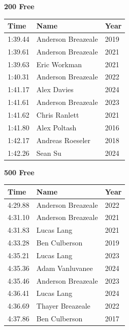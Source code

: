 \vspace{0.3em}
\vspace{1.2em}
\noindent\begin{minipage}[t]{0.48\textwidth}
\centering
\textbf{\textcolor{teamprimary}{200 Free}}\par
\vspace{0.5em}
\centering
\small
\renewcommand{\arraystretch}{1.0}
\setlength{\tabcolsep}{4pt}
\begin{tabular}{@{}p{1.8cm}p{3.0cm}p{1.0cm}@{}}
\toprule
\textbf{Time} & \textbf{Name} & \textbf{Year} \\
\midrule
1:39.44 & Anderson Breazeale & 2019 \\
1:39.61 & Anderson Breazeale & 2021 \\
1:39.63 & Eric Workman & 2021 \\
1:40.31 & Anderson Breazeale & 2022 \\
1:41.17 & Alex Davies & 2024 \\
1:41.61 & Anderson Breazeale & 2023 \\
1:41.62 & Chris Ranlett & 2021 \\
1:41.80 & Alex Poltash & 2016 \\
1:42.17 & Andreas Roeseler & 2018 \\
1:42.26 & Sean Su & 2024 \\
\bottomrule
\end{tabular}
\end{minipage}
\hfill
\begin{minipage}[t]{0.48\textwidth}
\centering
\textbf{\textcolor{teamprimary}{500 Free}}\par
\vspace{0.5em}
\centering
\small
\renewcommand{\arraystretch}{1.0}
\setlength{\tabcolsep}{4pt}
\begin{tabular}{@{}p{1.8cm}p{3.0cm}p{1.0cm}@{}}
\toprule
\textbf{Time} & \textbf{Name} & \textbf{Year} \\
\midrule
4:29.88 & Anderson Breazeale & 2022 \\
4:31.10 & Anderson Breazeale & 2021 \\
4:31.83 & Lucas Lang & 2021 \\
4:33.28 & Ben Culberson & 2019 \\
4:35.21 & Lucas Lang & 2023 \\
4:35.36 & Adam Vanluvanee & 2024 \\
4:35.46 & Anderson Breazeale & 2023 \\
4:36.41 & Lucas Lang & 2024 \\
4:36.69 & Thayer Breazeale & 2022 \\
4:37.86 & Ben Culberson & 2017 \\
\bottomrule
\end{tabular}
\end{minipage}
